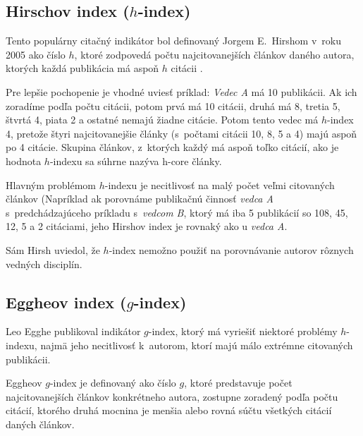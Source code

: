 \subsection{Hirschov index ($h$-index)}
\label{sec:h-index}

Tento populárny citačný indikátor bol definovaný Jorgem E.~Hirshom v~roku 2005
ako číslo $h$, ktoré zodpovedá počtu najcitovanejších článkov daného autora,
ktorých každá publikácia má aspoň $h$ citácii \citep{Hirsch2005}.

Pre lepšie pochopenie je vhodné uviesť príklad: \emph{Vedec A} má 10 publikácii.
Ak ich zoradíme podľa počtu citácii, potom prvá má 10 citácii, druhá má 8,
tretia 5, štvrtá 4, piata 2 a ostatné nemajú žiadne citácie.  Potom tento vedec
má $h$-index 4, pretože štyri najcitovanejšie články (s~počtami citácii 10, 8, 5
a 4) majú aspoň po 4 citácie.  Skupina článkov, z~ktorých každý má aspoň toľko
citácií, ako je hodnota $h$-indexu sa súhrne nazýva h-core články.

Hlavným problémom $h$-indexu je necitlivosť na malý počet veľmi citovaných
článkov (Napríklad ak porovnáme publikačnú činnosť \emph{vedca A}
s~predchádzajúceho príkladu s~\emph{vedcom B}, ktorý má iba 5 publikácií so 108,
45, 12, 5 a 2 citáciami, jeho Hirshov index je rovnaký ako u \emph{vedca A}.

Sám Hirsh uviedol, že $h$-index nemožno použiť na porovnávanie autorov rôznych
vedných disciplín.


\subsection{Eggheov index ($g$-index)}
\label{sec:g-index}

Leo Egghe \citeyearpar{Egghe2006} publikoval indikátor $g$-index, ktorý má
vyriešiť niektoré problémy $h$-indexu, najmä jeho necitlivosť k~autorom, ktorí
majú málo extrémne citovaných publikácii.

Eggheov $g$-index je definovaný ako číslo $g$, ktoré predstavuje počet
najcitovanejších článkov konkrétneho autora, zostupne zoradený podľa počtu
citácií, ktorého druhá mocnina je menšia alebo rovná súčtu všetkých citácií
daných článkov.

